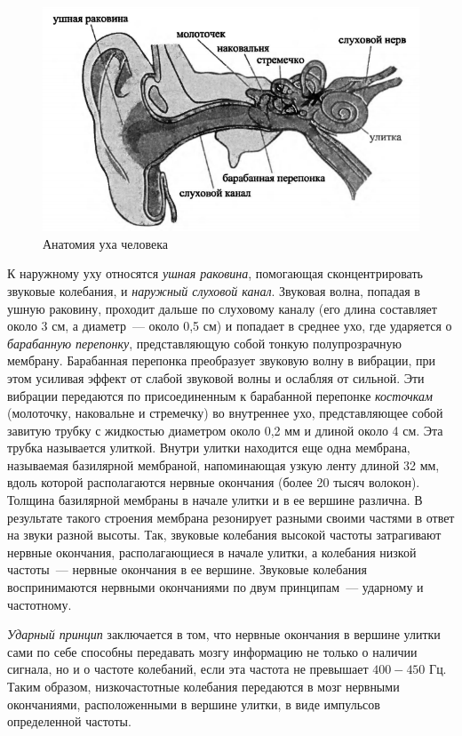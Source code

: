 \documentclass[oneside, final, 14pt]{extreport}
\begin{document}
\begin{figure}[h]
\centering
\includegraphics{pic-ear-01}
\caption{Анатомия уха человека}
\label{pic-ear-01}
\end{figure}

К наружному уху относятся {\itshape ушная раковина}, помогающая сконцентрировать звуковые колебания, и {\itshape наружный слуховой канал}. Звуковая волна, попадая в ушную раковину, проходит дальше по слуховому каналу (его длина составляет около
3 см, а диаметр~--- около 0,5 см) и попадает в среднее ухо, где ударяется о {\itshape барабанную перепонку}, представляющую собой тонкую полупрозрачную мембрану. Барабанная перепонка преобразует звуковую волну в вибрации, при этом усиливая эффект от слабой звуковой волны и ослабляя от сильной. Эти вибрации передаются по присоединенным к барабанной перепонке {\itshape косточкам} (молоточку, наковальне и стремечку) во внутреннее ухо, представляющее собой завитую трубку с жидкостью диаметром около 0,2 мм и длиной около 4 см. Эта трубка называется улиткой. Внутри улитки находится еще одна мембрана, называемая базилярной мембраной, напоминающая узкую ленту длиной 32 мм, вдоль которой располагаются нервные окончания (более 20 тысяч волокон). Толщина базилярной мембраны в начале улитки и в ее вершине различна. В результате такого строения мембрана резонирует разными своими частями в ответ на звуки разной высоты. Так, звуковые колебания высокой частоты затрагивают нервные окончания, располагающиеся в начале улитки, а колебания низкой частоты~--- нервные окончания в ее вершине. Звуковые колебания воспринимаются нервными окончаниями по двум принципам~--- ударному и частотному.

{\itshape Ударный принцип} заключается в том, что нервные окончания в вершине улитки сами по себе способны передавать мозгу информацию не только о наличии сигнала, но и о частоте колебаний, если эта частота не превышает $400-450$ Гц. Таким
образом, низкочастотные колебания передаются в мозг нервными окончаниями, расположенными в вершине улитки, в виде импульсов определенной частоты. 
\end{document}
